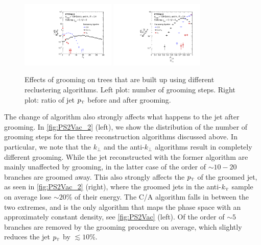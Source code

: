 \begin{figure}[ht]
\centering
\includegraphics[width=0.4\textwidth]{figures/SDAlgorithms/ndropClusteringComp.pdf}%
\includegraphics[width=0.4\textwidth]{figures/SDAlgorithms/ptratioClusteringComp.pdf}%
\caption{Effects of grooming on trees that are built up using different reclustering algorithms. Left plot: number of grooming steps. Right plot: ratio of jet $p_{\text{\tiny T}}$ before and after grooming.
}
\label{fig:PS2Vac_2}
\end{figure}
The change of algorithm also strongly affects what happens to the jet after grooming. In \autoref{fig:PS2Vac_2} (left), we show the distribution of the number of grooming steps for the three reconstruction algorithms discussed above. In particular, we note that the $k_\perp$ and the anti-$k_\perp$ algorithms result in completely different grooming. While the jet reconstructed with the former algorithm are mainly unaffected by grooming, in the latter case of the order of $\sim 10-20$ branches are groomed away. This also strongly affects the $p_{\text{\tiny T}}$ of the groomed jet, as seen in \autoref{fig:PS2Vac_2} (right), where the groomed jets in the anti-$k_{\text{\tiny T}}$ sample on average lose $\sim 20$\% of their energy. The C/A algorithm falls in between the two extremes, and is the only algorithm that maps the phase space with an approximately constant density, see \autoref{fig:PS2Vac} (left). Of the order of $\sim 5$ branches are removed by the grooming procedure on average, which slightly reduces the jet $p_{\text{\tiny T}}$ by $\lesssim 10$\%.

